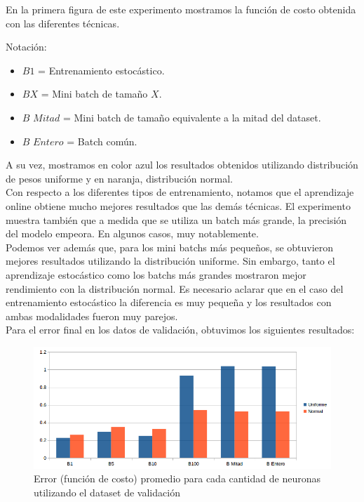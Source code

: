 En la primera figura de este experimento mostramos la función de costo obtenida con las diferentes técnicas.

Notación:
\begin{itemize}
\item $B1$ = Entrenamiento estocástico.
\item $BX$ = Mini batch de tamaño $X$.
\item $B$ $Mitad$ = Mini batch de tamaño equivalente a la mitad del dataset.
\item $B$ $Entero$ = Batch común.
\end{itemize}

A su vez, mostramos en color azul los resultados obtenidos utilizando distribución de pesos uniforme y en naranja, distribución normal.\\
Con respecto a los diferentes tipos de entrenamiento, notamos que el aprendizaje online obtiene mucho mejores resultados que las demás técnicas. El experimento muestra también que a medida que se utiliza un batch más grande, la precisión del modelo empeora. En algunos casos, muy notablemente.\\

Podemos ver además que,  para los mini batchs más pequeños, se obtuvieron mejores resultados utilizando la distribución uniforme. Sin embargo, tanto el aprendizaje estocástico como los batchs más grandes mostraron mejor rendimiento con la distribución normal. Es necesario aclarar que en el caso del entrenamiento estocástico la diferencia es muy pequeña y los resultados con ambas modalidades fueron muy parejos.\\

Para el error final en los datos de validación, obtuvimos los siguientes resultados:\\

\begin{figure}[h]
  \begin{center}
  \includegraphics[scale=0.65]{graficos/distribucion_error_validacion.png}
  \caption{Error (función de costo) promedio para cada cantidad de neuronas utilizando el dataset de validación}
  \end{center}
\end{figure}

